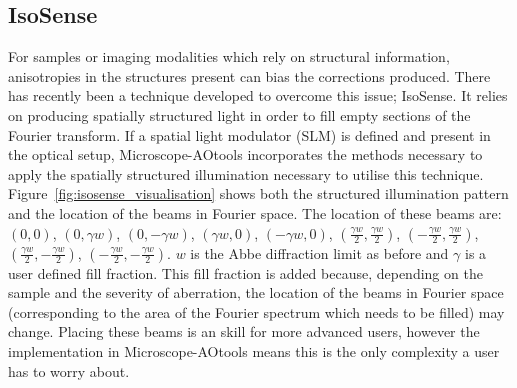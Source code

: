 \subsection{IsoSense}

For samples or imaging modalities which rely on structural information, anisotropies in the structures present can bias the corrections produced. There has recently been a technique developed to overcome this issue; IsoSense.\cite{vzurauskas2019isosense} It relies on producing spatially structured light in order to fill empty sections of the Fourier transform. If a spatial light modulator (SLM) is defined and present in the optical setup, Microscope-AOtools incorporates the methods necessary to apply the spatially structured illumination necessary to utilise this technique. Figure~\ref{fig:isosense_visualisation} shows both the structured illumination pattern and the location of the beams in Fourier space. The location of these beams are: $(0,0)$, $(0,\gamma w)$, $(0,-\gamma w)$, $(\gamma w, 0)$, $(-\gamma w, 0)$, $(\frac{\gamma w}{2}, \frac{\gamma w}{2})$, $(-\frac{\gamma w}{2}, \frac{\gamma w}{2})$, $(\frac{\gamma w}{2}, -\frac{\gamma w}{2})$, $(-\frac{\gamma w}{2}, -\frac{\gamma w}{2})$. $w$ is the Abbe diffraction limit as before and $\gamma$ is a user defined fill fraction. This fill fraction is added because, depending on the sample and the severity of aberration, the location of the beams in Fourier space (corresponding to the area of the Fourier spectrum which needs to be filled) may change. Placing these beams is an skill for more advanced users, however the implementation in Microscope-AOtools means this is the only complexity a user has to worry about.

